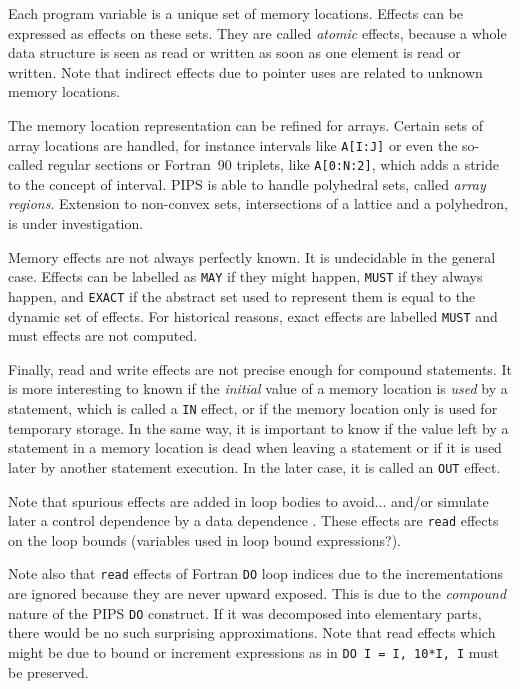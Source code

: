 \documentclass[a4paper]{article}
\begin{document}
Each program variable is a unique set of memory locations. Effects can
be expressed as effects on these sets. They are called \emph{atomic}
effects, because a whole data structure is seen as read or written as
soon as one element is read or written. Note that indirect effects due
to pointer uses are related to unknown memory locations.

The memory location representation can be refined for arrays. Certain
sets of array locations are handled, for instance intervals like
\verb/A[I:J]/ or even the so-called regular sections or Fortran~90
triplets, like \verb/A[0:N:2]/, which adds a stride to the concept of
interval. PIPS is able to handle polyhedral sets, called \emph{array
regions}. Extension to non-convex sets, intersections of a lattice and a
polyhedron, is under investigation.

Memory effects are not always perfectly known. It is undecidable in the
general case. Effects can be labelled as \texttt{MAY} if they might happen,
\texttt{MUST} if they always happen, and \texttt{EXACT} if the abstract set
used to represent them is equal to the dynamic set of effects. For
historical reasons, exact effects are labelled \texttt{MUST} and must
effects are not computed.

Finally, read and write effects are not precise enough for compound
statements. It is more interesting to known if the \emph{initial} value
of a memory location is \emph{used} by a statement, which is called a
\texttt{IN} effect, or if the memory location only is used for temporary
storage. In the same way, it is important to know if the value left by a
statement in a memory location is dead when leaving a statement or if it
is used later by another statement execution. In the later case, it is
called an \texttt{OUT} effect.

Note that spurious effects are added in loop bodies to avoid... and/or
simulate later a control dependence by a data dependence .  These effects are \verb/read/ effects on the loop bounds
(variables used in loop bound expressions?).

Note also that \verb/read/ effects of Fortran \verb/DO/ loop indices due
to the incrementations are ignored because they are never upward
exposed. This is due to the \emph{compound} nature of the PIPS \verb/DO/
construct. If it was decomposed into elementary parts, there would be no
such surprising approximations. Note that read effects which might be due
to bound or increment expressions as in \verb/DO I = I, 10*I, I/ must be
preserved.
\end{document}
